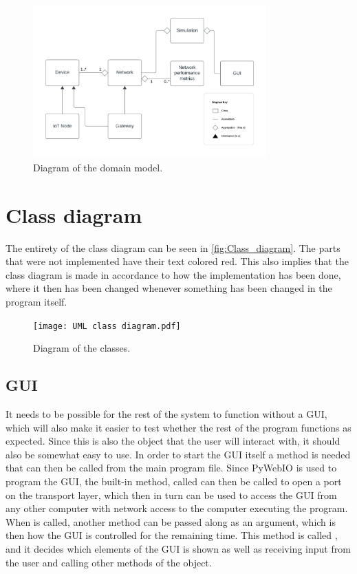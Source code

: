 \begin{figure}[H]
  \centering
  \includegraphics[width=0.8\textwidth]{Domain_model.pdf}
  \caption{Diagram of the domain model.}
  \label{fig:Domain_model}
\end{figure}

\section{Class diagram}\label{sec:Class_diagram}
The entirety of the class diagram can be seen in \autoref{fig:Class_diagram}. The parts that were not implemented have their text colored red. This also implies that the class diagram is made in accordance to how the implementation has been done, where it then has been changed whenever something has been changed in the program itself.

\begin{figure}[H]
  \centering
  \texttt{[image: UML class diagram.pdf]}
  \caption{Diagram of the classes.}
  \label{fig:Class_diagram}
\end{figure}

\subsection{GUI} It needs to be possible for the rest of the system to function without a GUI, which will also make it easier to test whether the rest of the program functions as expected. Since this is also the object that the user will interact with, it should also be somewhat easy to use. In order to start the GUI itself a  method is needed that can then be called from the main program file. Since PyWebIO is used to program the GUI, the built-in method, called  can then be called to open a port on the transport layer, which then in turn can be used to access the GUI from any other computer with network access to the computer executing the program. When  is called, another method can be passed along as an argument, which is then how the GUI is controlled for the remaining time. This method is called , and it decides which elements of the GUI is shown as well as receiving input from the user and calling other methods of the  object.

